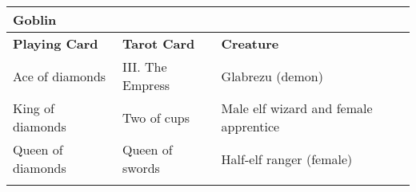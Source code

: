\begin{longtable}{llllll}
{\begin{minipage}[t]{2.191in}
Goblin\end{minipage}}\\
\hline
\multicolumn{1}{|p{1.102in}|}{\begin{minipage}[t]{1.102in}\raggedright
\textbf{Playing Card}\end{minipage}} & \multicolumn{1}{p{1.207in}|}{\begin{minipage}[t]{1.207in}\raggedright
\textbf{Tarot Card}\end{minipage}} & \multicolumn{4}{p{2.191in}|}{\begin{minipage}[t]{2.191in}\raggedright
\textbf{Creature}\end{minipage}}\\
\hline
\multicolumn{1}{|p{1.102in}|}{\begin{minipage}[t]{1.102in}\raggedright
Ace of diamonds\end{minipage}} & \multicolumn{1}{p{1.207in}|}{\begin{minipage}[t]{1.207in}\raggedright
III. The Empress\end{minipage}} & \multicolumn{4}{p{2.191in}|}{\begin{minipage}[t]{2.191in}\raggedright
Glabrezu (demon)\end{minipage}}\\
\hline
\multicolumn{1}{|p{1.102in}|}{\begin{minipage}[t]{1.102in}\raggedright
King of diamonds\end{minipage}} & \multicolumn{1}{p{1.207in}|}{\begin{minipage}[t]{1.207in}\raggedright
Two of cups\end{minipage}} & \multicolumn{4}{p{2.191in}|}{\begin{minipage}[t]{2.191in}\raggedright
Male elf wizard and female apprentice\end{minipage}}\\
\hline
\multicolumn{1}{|p{1.102in}|}{\begin{minipage}[t]{1.102in}\raggedright
Queen of diamonds\end{minipage}} & \multicolumn{1}{p{1.207in}|}{\begin{minipage}[t]{1.207in}\raggedright
Queen of swords\end{minipage}} & \multicolumn{4}{p{2.191in}|}{\begin{minipage}[t]{2.191in}\raggedright
Half-elf ranger (female)\end{minipage}}\\
\hline
\multicolumn{1}{|p{1.102in}|}{\begin{minipage}[t]{1.102in}\raggedright

\end{minipage}}
\end{longtable}
